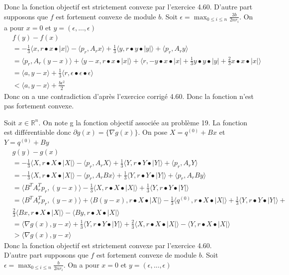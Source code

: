 \documentclass[12pt, letterpaper]{article}
\newcommand{\R}{\mathbb{R}^n}
\begin{document}
Donc la fonction objectif est strictement convexe par l'exercice 4.60. 
D'autre part supposons que $f$ est fortement convexe de module $b$. Soit $\epsilon =  \max_{0\leq i \leq n} \frac{3b}{2nr_i}$. On a pour $x = 0$ et $y = (\epsilon,...,\epsilon)$
\begin{align*}
&f(y) - f(x) \\
&= -\frac{1}{3} \langle x,r \bullet x \bullet |x|\rangle  - \langle p_r,A_rx\rangle  + \frac{1}{3}\langle y,r \bullet y \bullet |y|\rangle  + \langle p_r,A_ry\rangle   \\
&= \langle p_r,A_r(y - x)\rangle  + \langle y-x, r \bullet x \bullet |x|\rangle  + \langle r, -y \bullet x \bullet |x| + \frac{1}{3}y \bullet y \bullet |y| + \frac{2}{3}x \bullet x \bullet |x|\rangle \\
&= \langle a,y-x\rangle   + \frac{1}{3}\langle r, \epsilon \bullet \epsilon \bullet \epsilon\rangle  \\
&<  \langle a,y-x\rangle  + \frac{b \epsilon^2}{2}
\end{align*}
Donc on a une contradiction d'après l'exercice corrigé 4.60. Donc la fonction n'est pas fortement convexe.

Soit $x\in\R$. On note g la fonction objectif associée au problème 19. La fonction est différentiable donc $\partial g(x) = \{\nabla g(x)\}$. On pose $X = q^{(0)} + Bx$ et $Y = q^{(0)} + By$
\begin{align*}
&g(y) - g(x) \\
&= -\frac{1}{3} \langle X,r \bullet X \bullet |X|\rangle  - \langle p_r,A_rX\rangle  + \frac{1}{3}\langle Y,r \bullet Y \bullet |Y|\rangle  + \langle p_r,A_rY\rangle   \\
&= -\frac{1}{3} \langle X,r \bullet X \bullet |X|\rangle  - \langle p_r,A_rBx\rangle  + \frac{1}{3}\langle Y,r \bullet Y \bullet |Y|\rangle  + \langle p_r,A_rBy\rangle   \\
&= \langle B^TA_r^Tp_r,(y - x)\rangle -\frac{1}{3} \langle X,r \bullet X \bullet |X|\rangle + \frac{1}{3}\langle Y,r \bullet Y \bullet |Y|\rangle \\
&= \langle B^TA_r^Tp_r,(y - x)\rangle + \langle B(y-x),r \bullet X \bullet |X|\rangle - \frac{1}{3}\langle q^{(0)},r \bullet X \bullet |X|\rangle + \frac{1}{3}\langle Y,r \bullet Y \bullet |Y|\rangle + \\
&\frac{2}{3} \langle Bx,r \bullet X \bullet |X|\rangle -  \langle By,r \bullet X \bullet |X|\rangle\\
&=  \langle \nabla g(x),y-x\rangle + \frac{1}{3}\langle Y,r \bullet Y \bullet |Y|\rangle + \frac{2}{3} \langle X,r \bullet X \bullet |X|\rangle -  \langle Y,r \bullet X \bullet |X|\rangle \\
&> \langle \nabla g(x),y-x\rangle \tag{Par le lemme du début}
\end{align*}
Donc la fonction objectif est strictement convexe par l'exercice 4.60. \\
D'autre part supposons que $f$ est fortement convexe de module $b$. Soit $\epsilon =  \max_{0\leq i \leq n} \frac{b}{2nr_i}$. On a pour $x = 0$ et $y = (\epsilon,...,\epsilon)$
\end{document}
